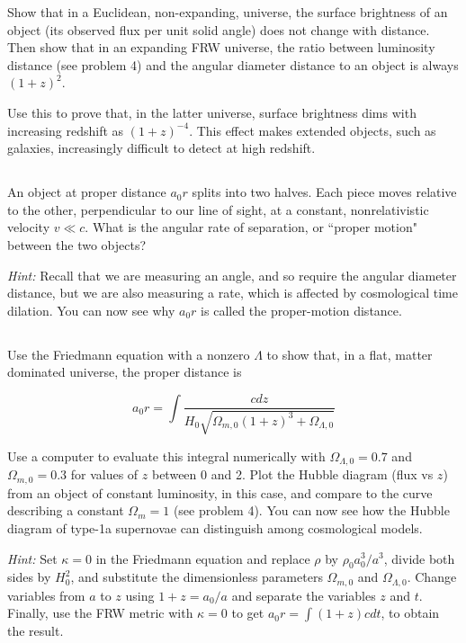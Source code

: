 \documentclass[12pt]{article}
\begin{document}
Show that in a Euclidean, non-expanding, universe, the surface brightness of an object (its observed flux per unit solid angle) does not change with distance. Then show that in an expanding FRW universe, the ratio between luminosity distance (see problem 4) and the angular diameter distance to an object is always \((1+z)^2\).

Use this to prove that, in the latter universe, surface brightness dims with increasing redshift as \( (1+z)^{-4}\). This effect makes extended objects, such as galaxies, increasingly difficult to detect at high redshift.

\subsection{} %

An object at proper distance \(a_0r\) splits into two halves. Each piece moves relative to the other, perpendicular to our line of sight, at a constant, nonrelativistic velocity \(v\ll c\). What is the angular rate of separation, or ``proper motion" between the two objects?

\textit{Hint:} Recall that we are measuring an angle, and so require the angular diameter distance, but we are also measuring a rate, which is affected by cosmological time dilation. You can now see why \(a_0r\) is called the proper-motion distance.

\subsection{} %

Use the Friedmann equation with a nonzero \(\Lambda\) to show that, in a flat, matter dominated universe, the proper distance is

\[ a_0r = \int \frac{cdz}{H_0\sqrt{\Omega_{m,0}(1+z)^3+\Omega_{\Lambda,0}}}
\]

Use a computer to evaluate this integral numerically with \(\Omega_{\Lambda,0} = 0.7\) and \(\Omega_{m,0}=0.3\) for values of \(z\) between 0 and 2. Plot the Hubble diagram (flux vs \(z\)) from an object of constant luminosity, in this case, and compare to the curve describing a constant \(\Omega_m = 1\) (see problem 4). You can now see how the Hubble diagram of type-1a supernovae can distinguish among cosmological models.

\textit{Hint:} Set \(\kappa=0\) in the Friedmann equation and replace \(\rho\) by \(\rho_0a_0^3/a^3\), divide both sides by \(H_0^2\), and substitute the dimensionless parameters \(\Omega_{m,0}\) and \(\Omega_{\Lambda,0}\). Change variables from \(a\) to \(z\) using \( 1+z = a_0/a\) and separate the variables \(z\) and \(t\). Finally, use the FRW metric with \(\kappa=0\) to get \(a_0r = \int(1+z)cdt\), to obtain the result. 
\end{document}
